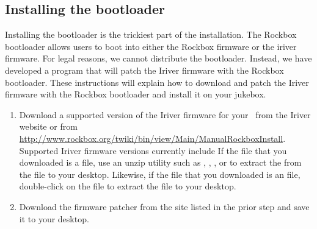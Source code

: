 \subsection{Installing the bootloader}
  Installing the bootloader is the trickiest part of the installation.
  The Rockbox bootloader allows users to boot into either the Rockbox 
  firmware or the iriver firmware. For legal reasons, we cannot distribute 
  the bootloader. Instead, we have developed a program that will patch the 
  Iriver firmware with the Rockbox bootloader. These instructions will explain 
  how to download and patch the Iriver firmware with the Rockbox bootloader 
  and install it on your jukebox.

\begin{enumerate}
	\item Download a supported version of the Iriver firmware for your \playername\ from 
	the Iriver website or from 
	\url{http://www.rockbox.org/twiki/bin/view/Main/ManualRockboxInstall}.
	Supported	Iriver firmware versions currently include 
		If the file that you downloaded is a  file, use an unzip 
		utility such as , , ,	or 
		 to extract the  from the  file
		to your desktop. Likewise, if the file that you downloaded is an 
		 file, double-click on the 	file to extract 
		the  file to your desktop.
		
	\item Download the firmware patcher  from the site 
	listed in the prior step and save it to your desktop.



\end{enumerate}
